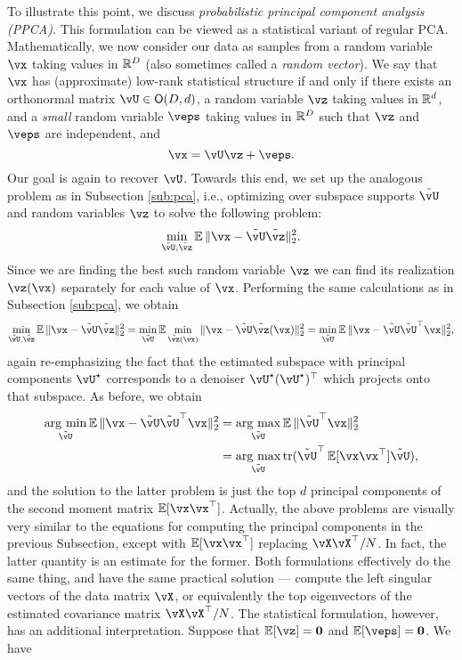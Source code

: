 \documentclass[\toplevelprefix/book-main.tex]{subfiles}
\begin{document}
To illustrate this point, we discuss \textit{probabilistic principal component analysis (PPCA).} This formulation can be viewed as a statistical variant of regular PCA. Mathematically, we now consider our data as samples from a random variable \(\vx\) taking values in \(\mathbb{R}^{D}\) (also sometimes called a \textit{random vector}). We say that \(\vx\) has (approximate) low-rank statistical structure if and only if there exists an orthonormal matrix \(\vU \in \O(D, d)\), a random variable \(\vz\) taking values in \(\mathbb{R}^{d}\), and a \textit{small} random variable \(\veps\) taking values in \(\mathbb{R}^{D}\) such that \(\vz\) and \(\veps\) are independent, and
\begin{equation}
    \vx = \vU\vz + \veps.
\end{equation}
Our goal is again to recover \(\vU\). Towards this end, we set up the analogous problem as in Subsection \eqref{sub:pca}, i.e., optimizing over subspace supports \(\tilde{\vU}\) and random variables \(\vz\) to solve the following problem:
\begin{equation}
    \min_{\tilde{\vU}, \tilde{\vz}}\Ex\norm{\vx - \tilde{\vU}\tilde{\vz}}_{2}^{2}.
\end{equation}
Since we are finding the best such random variable \(\vz\) we can find its realization \(\vz(\vx)\) separately for each value of \(\vx\). Performing the same calculations as in Subsection \eqref{sub:pca}, we obtain %
\begin{equation}\label{eq:ppca_denoising}
    \min_{\tilde{\vU}, \tilde{\vz}}\Ex\norm{\vx - \tilde{\vU}\tilde{\vz}}_{2}^{2} = \min_{\tilde{\vU}}\Ex\min_{\tilde{\vz}(\vx)}\norm{\vx - \tilde{\vU}\tilde{\vz}(\vx)}_{2}^{2} = \min_{\tilde{\vU}}\Ex\norm{\vx - \tilde{\vU}\tilde{\vU}^{\top}\vx}_{2}^{2},
\end{equation}
again re-emphasizing the fact that the estimated subspace with principal components \(\vU^{\star}\) corresponds to a denoiser \(\vU^{\star}(\vU^{\star})^{\top}\) which projects onto that subspace. As before, we obtain 
\begin{align}\label{eq:PPCA}
    \argmin_{\tilde{\vU}}\Ex\norm{\vx - \tilde{\vU}\tilde{\vU}^{\top}\vx}_{2}^{2} 
    &= \argmax_{\tilde{\vU}}\Ex\norm{\tilde{\vU}^{\top}\vx}_{2}^{2} \\
    &= \argmax_{\tilde{\vU}}\tr(\tilde{\vU}^{\top}\Ex[\vx\vx^{\top}]\tilde{\vU}),
\end{align}
and the solution to the latter problem is just the top \(d\) principal components of the second moment matrix \(\Ex[\vx\vx^{\top}]\). Actually, the above problems are visually very similar to the equations for computing the principal components in the previous Subsection, except with \(\Ex[\vx\vx^{\top}]\) replacing \(\vX\vX^{\top}/N\). In fact, the latter quantity is an estimate for the former. Both formulations effectively do the same thing, and have the same practical solution --- compute the left singular vectors of the data matrix \(\vX\), or equivalently the top eigenvectors of the estimated covariance matrix \(\vX\vX^{\top}/N\). The statistical formulation, however, has an additional interpretation. Suppose that \(\Ex[\vz] = \vzero\) and \(\Ex[\veps] = \vzero\). We have
\end{document}
